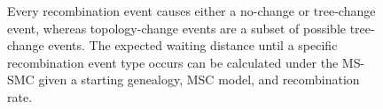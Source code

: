 \documentclass[11pt]{article}
\begin{document}
\begin{figure}[t]
{		Every recombination event causes either a no-change or tree-change event, whereas
		topology-change events are a subset of possible tree-change events. The expected waiting
		distance until a specific recombination event type occurs can be calculated under 
		the MS-SMC given a starting genealogy, MSC model, and recombination rate.
}
\label{fig:ARG-cartoon}
\end{figure}
\end{document}
